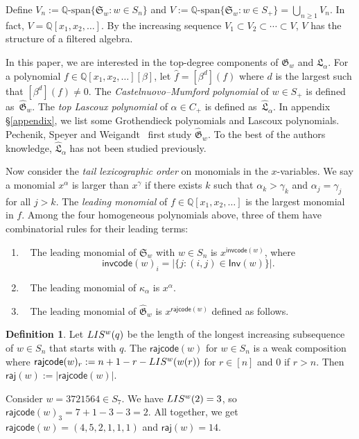 \documentclass[10pt]{amsart}
\theoremstyle{plain}
\theoremstyle{plain}
\theoremstyle{definition}
\theoremstyle{definition}
\newtheorem{defn}[defn]{Definition}
\theoremstyle{definition}
\theoremstyle{plain}
\theoremstyle{plain}
\theoremstyle{plain}
\theoremstyle{plain}
\theoremstyle{plain}
\theoremstyle{remark}
\theoremstyle{remark}
\theoremstyle{plain}
\theoremstyle{plain}
\newcommand{\fG}{\mathfrak{G}}
\newcommand{\fGb}{\fG}
\newcommand{\fL}{\mathfrak{L}}
\newcommand{\fLb}{\fL}
\newcommand{\topLas}{\widehat{\fL}}
\newcommand{\topGro}{\widehat{\fG}}
\newcommand{\fS}{\mathfrak{S}}
\newcommand{\Q}{\mathbb{Q}}
\newcommand{\rajcode}{\mathsf{rajcode}}
\newcommand{\raj}{\mathsf{raj}}
\newcommand{\Inv}{\mathsf{Inv}}
\newcommand{\invcode}{\mathsf{invcode}}
\newcommand{\definition}[1]{{\color{darkred}\emph{#1}}}
\begin{document}
Define $V_n :=  \Q\textrm{-span}\{\fS_w: w \in S_n\}$ 
and $V :=  \Q\textrm{-span}\{\fS_w: w \in S_+\} = \bigcup_{n \geq 1} V_n$.
In fact, $V = \mathbb{Q}[x_1, x_2, \dots]$. 
By the increasing sequence 
$V_1 \subset V_2 \subset \cdots \subset V$,
$V$ has the structure of a filtered algebra. 


In this paper, we are interested in the top-degree 
components of $\fGb_w$ and $\fLb_\alpha$. 
For a polynomial $f \in \mathbb{Q}[x_1, x_2, \dots][\beta]$,
let $\widehat{f} = [\beta^d](f)$ where $d$ is the largest such that 
$[\beta^d](f) \neq 0$.
The \definition{Castelnuovo--Mumford polynomial} of $w \in S_+$
is defined as~$\topGro_w$.
The \definition{top Lascoux polynomial} of $\alpha \in C_+$
is defined as~$\topLas_\alpha$. In appendix \S\ref{appendix}, we list some Grothendieck polynomials and Lascoux polynomials.
Pechenik, Speyer and Weigandt~\cite{PSW} first study $\topGro_w$.
To the best of the authors knowledge, 
$\topLas_\alpha$ has not been studied previously. 

Now consider the \definition{tail lexicographic order} 
on monomials in the $x$-variables.
We say a monomial $x^\alpha$ is larger than $x^\gamma$
if there exists $k$ such that $\alpha_k > \gamma_k$ and 
$\alpha_j = \gamma_j$ for all $j > k$.
The \definition{leading monomial} of $f \in \Q[x_1, x_2, \dots]$
is the largest monomial in $f$. 
Among the four homogeneous
polynomials above,
three of them have combinatorial rules for their leading terms:
\begin{enumerate}
\item~\cite{BJS} The leading monomial of $\fS_w$ with $w \in S_n$
is $x^{\invcode(w)}$,
where $$\invcode(w)_i = |\{j: (i,j) \in \Inv(w)\}|.$$
\item~\cite{LS2} The leading monomial of $\kappa_\alpha$ is $x^\alpha$.
\item~\cite{PSW} The leading monomial of $\topGro_w$
is $x^{\rajcode(w)}$ defined as follows.
\end{enumerate}

\begin{defn}\cite{PSW}
\label{D: raj on permutations}
Let $\textup{LIS}^w(q)$ be the 
length of the longest increasing subsequence 
of $w\in S_n$ that starts with $q$.
The $\rajcode(w)$ for $w\in S_n$ is a weak composition
where 
$\rajcode(w)_r := n + 1 - r - \textup{LIS}^w(w(r))$ for $r \in [n]$
and $0$ if $r > n$.
Then $\raj(w) := |\rajcode(w)|$.
\end{defn}


\begin{exa}
\label{E: rajcode permutation}
Consider $w = 3721564 \in S_7$. We have $\textup{LIS}^w(2) = 3$, 
so $\rajcode(w)_3 = 7 + 1 - 3 - 3 = 2$.
All together,
we get $\rajcode(w) = (4,5,2,1,1,1)$ and $\raj(w) = 14$.
\end{exa}
\end{document}
